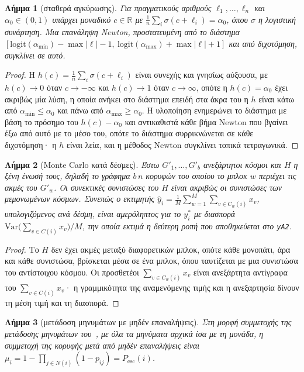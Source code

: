 \documentclass[11pt,a4paper]{article}
\newtheorem{lemma}{Λήμμα}
\theoremstyle{definition}
\theoremstyle{plain}
\newcommand{\Pesc}{P_{\mathrm{esc}}}
\begin{document}
\begin{lemma}[σταθερά αγκύρωσης]\label{lem:anchor}
Για πραγματικούς αριθμούς $\ell_1,\dots,\ell_n$ και $\alpha_0\in(0,1)$ υπάρχει μοναδικό $c\in\mathbb R$ με $\frac1n\sum_i\sigma(c+\ell_i)=\alpha_0$, όπου $\sigma$ η λογιστική συνάρτηση. Μια επανάληψη Newton, προστατευμένη από το διάστημα $[\mathrm{logit}(\alpha_{\min})-\max|\ell|-1,\ \mathrm{logit}(\alpha_{\max})+\max|\ell|+1]$ και από διχοτόμηση, συγκλίνει σε αυτό.
\end{lemma}

\begin{proof}
Η $h(c)=\frac1n\sum_i\sigma(c+\ell_i)$ είναι συνεχής και γνησίως αύξουσα, με $h(c)\to0$ όταν $c\to-\infty$ και $h(c)\to1$ όταν $c\to\infty$, οπότε η $h(c)=\alpha_0$ έχει ακριβώς μία λύση, η οποία ανήκει στο διάστημα επειδή στα άκρα του η $h$ είναι κάτω από $\alpha_{\min}\le\alpha_0$ και πάνω από $\alpha_{\max}\ge\alpha_0$. Η υλοποίηση ενημερώνει το διάστημα με βάση το πρόσημο του $h(c)-\alpha_0$ και αντικαθιστά κάθε βήμα Newton που βγαίνει έξω από αυτό με το μέσο του, οπότε το διάστημα συρρικνώνεται σε κάθε διχοτόμηση· η $h$ είναι λεία, και η μέθοδος Newton συγκλίνει τοπικά τετραγωνικά.
\end{proof}

\begin{lemma}[Monte Carlo κατά δέσμες]\label{lem:mc}
Έστω $G'_1,\dots,G'_b$ ανεξάρτητοι κόσμοι και $H$ η ξένη ένωσή τους, δηλαδή το γράφημα $b\,n$ κορυφών του οποίου το μπλοκ $w$ περιέχει τις ακμές του $G'_w$. Οι συνεκτικές συνιστώσες του $H$ είναι ακριβώς οι συνιστώσες των μεμονωμένων κόσμων. Συνεπώς ο εκτιμητής $\hat y_i=\frac1M\sum_{w=1}^M\sum_{v\in C_w(i)}x_v$, υπολογιζόμενος ανά δέσμη, είναι αμερόληπτος για το $y^*_i$ με διασπορά $\mathrm{Var}\big(\sum_{v\in C(i)}x_v\big)/M$, την οποία εκτιμά η δεύτερη ροπή που αποθηκεύεται στο \texttt{yA2}.
\end{lemma}

\begin{proof}
Το $H$ δεν έχει ακμές μεταξύ διαφορετικών μπλοκ, οπότε κάθε μονοπάτι, άρα και κάθε συνιστώσα, βρίσκεται μέσα σε ένα μπλοκ, όπου ταυτίζεται με μια συνιστώσα του αντίστοιχου κόσμου. Οι προσθετέοι $\sum_{v\in C_w(i)}x_v$ είναι ανεξάρτητα αντίγραφα του $\sum_{v\in C(i)}x_v$· η γραμμικότητα της αναμενόμενης τιμής και η ανεξαρτησία δίνουν τη μέση τιμή και τη διασπορά.
\end{proof}

\begin{lemma}[μετάδοση μηνυμάτων με μηδέν επαναλήψεις]\label{lem:knz}
Στη μορφή συμμετοχής της μετάδοσης μηνυμάτων του~\cite{knz14}, με όλα τα μηνύματα αρχικά ίσα με τη μονάδα, η συμμετοχή της κορυφής μετά από μηδέν επαναλήψεις είναι $\mu_i=1-\prod_{j\in N(i)}(1-p_{ij})=\Pesc(i)$.
\end{lemma}
\end{document}
